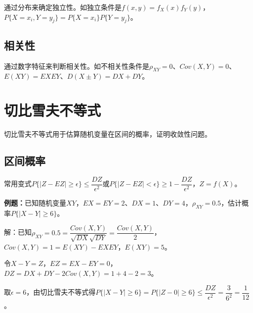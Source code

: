 \documentclass[UTF8, 12pt]{ctexart}
\begin{document}
通过分布来确定独立性。如独立条件是$f(x,y)=f_X(x)f_Y(y)$，$P\{X=x_i,Y=y_j\}=P\{X=x_i\}P\{Y=y_j\}$。

\subsection{相关性}

通过数字特征来判断相关性。如不相关性条件是$\rho_{XY}=0$、$Cov(X,Y)=0$、$E(XY)=EXEY$、$D(X\pm Y)=DX+DY$。

\section{切比雪夫不等式}

切比雪夫不等式用于估算随机变量在区间的概率，证明收敛性问题。

\subsection{区间概率}

常用变式$P\{\vert Z-EZ\vert\geqslant\epsilon\}\leqslant\dfrac{DZ}{\epsilon^2}$或$P\{\vert Z-EZ\vert<\epsilon\}\geqslant1-\dfrac{DZ}{\epsilon^2}$，$Z=f(X)$。

\textbf{例题：}已知随机变量$XY$，$EX=EY=2$、$DX=1$、$DY=4$，$\rho_{XY}=0.5$，估计概率$P\{\vert X-Y\vert\geqslant6\}$。

解：已知$\rho_{XY}=0.5=\dfrac{Cov(X,Y)}{\sqrt{DX}\sqrt{DY}}=\dfrac{Cov(X,Y)}{2}$，$Cov(X,Y)=1=E(XY)-EXEY$，$E(XY)=5$。

令$X-Y=Z$，$EZ=EX-EY=0$，$DZ=DX+DY-2Cov(X,Y)=1+4-2=3$。

取$\epsilon=6$，由切比雪夫不等式得$P\{\vert X-Y\vert\geqslant6\}=P\{\vert Z-0\vert\geqslant6\}\leqslant\dfrac{DZ}{\epsilon^2}=\dfrac{3}{6^2}=\dfrac{1}{12}$。
\end{document}
